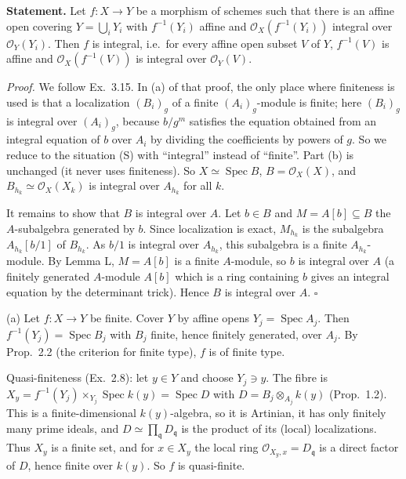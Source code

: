 \documentclass[11pt]{article}
\begin{document}
\pf
\textbf{Statement.} Let $f:X\to Y$ be a morphism of schemes such that there is an affine open covering $Y=\bigcup_iY_i$ with $f^{-1}(Y_i)$ affine and $\mathcal{O}_X(f^{-1}(Y_i))$ integral over $\mathcal{O}_Y(Y_i)$. Then $f$ is integral, i.e.\ for every affine open subset $V$ of $Y$, $f^{-1}(V)$ is affine and $\mathcal{O}_X(f^{-1}(V))$ is integral over $\mathcal{O}_Y(V)$.

\emph{Proof.} We follow Ex.~3.15. In (a) of that proof, the only place where finiteness is used is that a localization $(B_i)_g$ of a finite $(A_i)_g$-module is finite; here $(B_i)_g$ is integral over $(A_i)_g$, because $b/g^m$ satisfies the equation obtained from an integral equation of $b$ over $A_i$ by dividing the coefficients by powers of $g$. So we reduce to the situation (S) with ``integral'' instead of ``finite''. Part (b) is unchanged (it never uses finiteness). So $X\simeq\operatorname{Spec}B$, $B=\mathcal{O}_X(X)$, and $B_{h_k}\simeq\mathcal{O}_X(X_k)$ is integral over $A_{h_k}$ for all $k$.

It remains to show that $B$ is integral over $A$. Let $b\in B$ and $M=A[b]\subseteq B$ the $A$-subalgebra generated by $b$. Since localization is exact, $M_{h_k}$ is the subalgebra $A_{h_k}[b/1]$ of $B_{h_k}$. As $b/1$ is integral over $A_{h_k}$, this subalgebra is a finite $A_{h_k}$-module. By Lemma L, $M=A[b]$ is a finite $A$-module, so $b$ is integral over $A$ (a finitely generated $A$-module $A[b]$ which is a ring containing $b$ gives an integral equation by the determinant trick). Hence $B$ is integral over $A$. \hfill$\square$

\pf
(a) Let $f:X\to Y$ be finite. Cover $Y$ by affine opens $Y_j=\operatorname{Spec}A_j$. Then $f^{-1}(Y_j)=\operatorname{Spec}B_j$ with $B_j$ finite, hence finitely generated, over $A_j$. By Prop.~2.2 (the criterion for finite type), $f$ is of finite type.

Quasi-finiteness (Ex.~2.8): let $y\in Y$ and choose $Y_j\ni y$. The fibre is $X_y=f^{-1}(Y_j)\times_{Y_j}\operatorname{Spec}k(y)=\operatorname{Spec}D$ with $D=B_j\otimes_{A_j}k(y)$ (Prop.~1.2). This is a finite-dimensional $k(y)$-algebra, so it is Artinian, it has only finitely many prime ideals, and $D\simeq\prod_{\mathfrak q}D_{\mathfrak q}$ is the product of its (local) localizations. Thus $X_y$ is a finite set, and for $x\in X_y$ the local ring $\mathcal{O}_{X_y,x}=D_{\mathfrak q}$ is a direct factor of $D$, hence finite over $k(y)$. So $f$ is quasi-finite.
\end{document}
